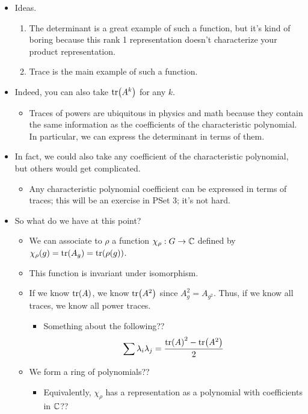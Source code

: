 \documentclass[../notes.tex]{subfiles}
\begin{document}
\begin{itemize}
    \item Ideas.
    \begin{enumerate}
        \item The determinant is a great example of such a function, but it's kind of boring because this rank 1 representation doesn't characterize your product representation.
        \item Trace is the main example of such a function.
    \end{enumerate}
    \item Indeed, you can also take $\tr(A^k)$ for any $k$.
    \begin{itemize}
        \item Traces of powers are ubiquitous in physics and math because they contain the same information as the coefficients of the characteristic polynomial. In particular, we can express the determinant in terms of them.
    \end{itemize}
    \item In fact, we could also take any coefficient of the characteristic polynomial, but others would get complicated.
    \begin{itemize}
        \item Any characteristic polynomial coefficient can be expressed in terms of traces; this will be an exercise in PSet 3; it's not hard.
    \end{itemize}
    \item So what do we have at this point?
    \begin{itemize}
        \item We can associate to $\rho$ a function $\chi_\rho:G\to\mathbb{C}$ defined by $\chi_\rho(g)=\tr(A_g)=\tr(\rho(g))$.
        \item This function is invariant under isomorphism.
        \item If we know $\tr(A)$, we know $\tr(A^2)$ since $A_g^2=A_{g^2}$. Thus, if we know all traces, we know all power traces.
        \begin{itemize}
            \item Something about the following??
            \begin{equation*}
                \sum\lambda_i\lambda_j = \frac{\tr(A)^2-\tr(A^2)}{2}
            \end{equation*}
        \end{itemize}
        \item We form a ring of polynomials??
        \begin{itemize}
            \item Equivalently, $\chi_\rho$ has a representation as a polynomial with coefficients in $\mathbb{C}$??

\end{itemize}
\end{itemize}
\end{itemize}
\end{document}
